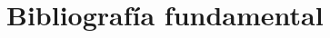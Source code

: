 \section{Bibliografía fundamental}
\label{sec:bibliografia}


\printbibliography[title={Referencias}, heading=none]
